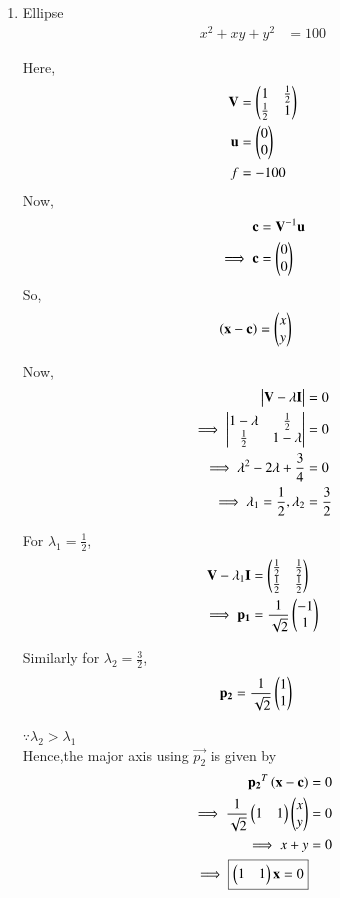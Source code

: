 \begin{enumerate}
    \item Ellipse
    \begin{align}
        x^2+xy+y^2 &= 100
    \end{align}
    
    Here,
    \begin{align}
    \mathbf{V} &= \begin{pmatrix}1 & \frac{1}{2} \\ \frac{1}{2} & 1\end{pmatrix} \\
    \mathbf{u} &= \begin{pmatrix}0 \\ 0\end{pmatrix} \\
    f &= -100
    \end{align}
    Now,
    \begin{align}
    \mathbf{c} &= \mathbf{V}^{-1}\mathbf{u}\\
    \implies \mathbf{c} &= \begin{pmatrix}0 \\ 0\end{pmatrix}
    \end{align}
    So,
    \begin{align}
    \left(\mathbf{x}-\mathbf{c}\right) &= \begin{pmatrix}x \\ y\end{pmatrix}
    \end{align}
    
    Now,
    \begin{align}
        \begin{vmatrix}\mathbf{V}-\lambda\mathbf{I}\end{vmatrix} &= 0 \\
        \implies \begin{vmatrix}1-\lambda & \frac{1}{2} \\ \frac{1}{2} & 1-\lambda\end{vmatrix} &= 0 \\
        \implies \lambda^2-2\lambda+\frac{3}{4} &= 0 \\
        \implies \lambda_1 =\frac{1}{2},\lambda_2 &= \frac{3}{2}
    \end{align}
    
    For $\lambda_1=\frac{1}{2}$,
    \begin{align}
        \mathbf{V}-\lambda_1\mathbf{I} &= \begin{pmatrix}\frac{1}{2} & \frac{1}{2} \\ \frac{1}{2} & \frac{1}{2}\end{pmatrix} \\
        \implies \mathbf{p_1} &= \frac{1}{\sqrt{2}}\begin{pmatrix}-1 \\ 1\end{pmatrix}
    \end{align}
    
    Similarly for $\lambda_2=\frac{3}{2}$,
    \begin{align}
        \mathbf{p_2} &= \frac{1}{\sqrt{2}}\begin{pmatrix}1 \\ 1\end{pmatrix}
    \end{align}
    
    $\because \lambda_2>\lambda_1$ \\
    Hence,the major axis using $\vec{p_2}$ is given by
    \begin{align}
        \mathbf{p_2}^T\left(\mathbf{x}-\mathbf{c}\right) &= 0 \\
        \implies \frac{1}{\sqrt{2}}\begin{pmatrix}1 & 1\end{pmatrix}\begin{pmatrix}x \\ y\end{pmatrix} &= 0 \\
        \implies x+y &= 0 \\
        \implies \boxed{\begin{pmatrix}1 & 1\end{pmatrix}\mathbf{x} =0}
    \end{align}
    

\end{enumerate}
